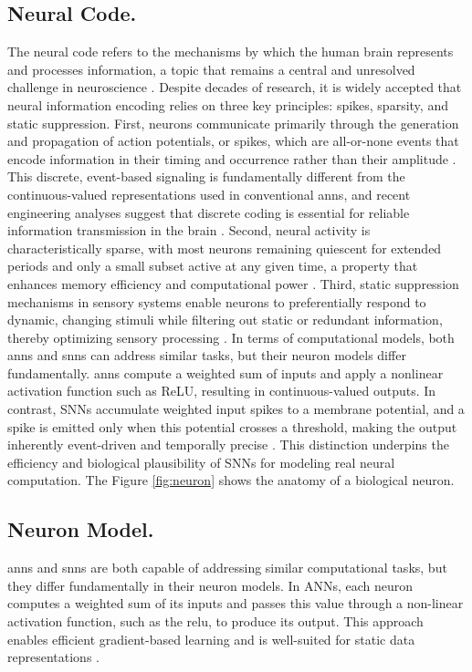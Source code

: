 \subsection{Neural Code.}
The neural code refers to the mechanisms by which the human brain represents and processes information, a topic that remains a central and unresolved challenge in neuroscience \cite{shimazaki2025neural, cao2025neuronal, tee2018information}. Despite decades of research, it is widely accepted that neural information encoding relies on three key principles: spikes, sparsity, and static suppression. First, neurons communicate primarily through the generation and propagation of action potentials, or spikes, which are all-or-none events that encode information in their timing and occurrence rather than their amplitude \cite{shimazaki2025neural, tee2018information}. This discrete, event-based signaling is fundamentally different from the continuous-valued representations used in conventional \glspl{ann}, and recent engineering analyses suggest that discrete coding is essential for reliable information transmission in the brain \cite{tee2018information}. Second, neural activity is characteristically sparse, with most neurons remaining quiescent for extended periods and only a small subset active at any given time, a property that enhances memory efficiency and computational power \cite{cao2025neuronal, fernandino2022decoding}. Third, static suppression mechanisms in sensory systems enable neurons to preferentially respond to dynamic, changing stimuli while filtering out static or redundant information, thereby optimizing sensory processing \cite{shimazaki2025neural}. In terms of computational models, both \glspl{ann} and \glspl{snn} can address similar tasks, but their neuron models differ fundamentally. \glspl{ann} compute a weighted sum of inputs and apply a nonlinear activation function such as ReLU, resulting in continuous-valued outputs. In contrast, SNNs accumulate weighted input spikes to a membrane potential, and a spike is emitted only when this potential crosses a threshold, making the output inherently event-driven and temporally precise \cite{shimazaki2025neural, tee2018information}. This distinction underpins the efficiency and biological plausibility of SNNs for modeling real neural computation. The Figure \ref{fig:neuron} shows the anatomy of a biological neuron.

\subsection{Neuron Model.}
\glspl{ann} and \glspl{snn} are both capable of addressing similar computational tasks, but they differ fundamentally in their neuron models. In ANNs, each neuron computes a weighted sum of its inputs and passes this value through a non-linear activation function, such as the \gls{relu}, to produce its output. This approach enables efficient gradient-based learning and is well-suited for static data representations \cite{Xu2024}.

